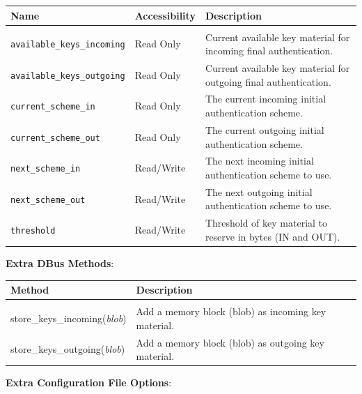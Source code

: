 \begin{tabular}{llp{7cm}}

Name                                & Accessibility &   Description \\
\hline
\\
\texttt{available\_keys\_incoming}  & Read Only     &   Current available key material for incoming final authentication. \\ [0.5em]
\texttt{available\_keys\_outgoing}  & Read Only     &   Current available key material for outgoing final authentication. \\ [0.5em]
\texttt{current\_scheme\_in}        & Read Only     &   The current incoming initial authentication scheme. \\ [0.5em]
\texttt{current\_scheme\_out}       & Read Only     &   The current outgoing initial authentication scheme. \\ [0.5em]
\texttt{next\_scheme\_in}           & Read/Write    &   The next incoming initial authentication scheme to use. \\ [0.5em]
\texttt{next\_scheme\_out}          & Read/Write    &   The next outgoing initial authentication scheme to use. \\ [0.5em]
\texttt{threshold}                  & Read/Write    &   Threshold of key material to reserve in bytes (IN and OUT). \\ [0.5em]

\end{tabular}

\bigskip

\noindent \textbf{Extra DBus Methods}: 

\medskip

\begin{tabular}{lp{10cm}}

Method                              & Description \\
\hline
\\
store\_keys\_incoming(\emph{blob})  & Add a memory block (blob) as incoming key material. \\ [0.5em]
store\_keys\_outgoing(\emph{blob})  & Add a memory block (blob) as outgoing key material. \\ [0.5em]

\end{tabular}

\bigskip

\clearpage

\noindent \textbf{Extra Configuration File Options}:

